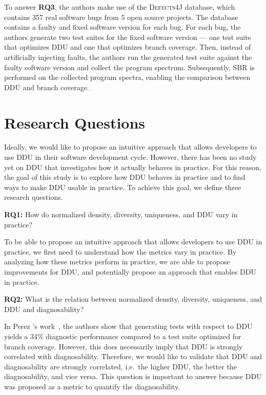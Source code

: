 \documentclass[twoside,a4paper,11pt]{memoir}
\begin{document}
To answer \textbf{RQ3}, the authors make use of the \textsc{Defects4J} database, which contains 357 real software bugs from 5 open source projects.
The database contains a faulty and fixed software version for each bug.
For each bug, the authors generate two test suites for the fixed software version --- one test suite that optimizes DDU and one that optimizes branch coverage.
Then, instead of artificially injecting faults, the authors run the generated test suite against the faulty software version and collect the program spectrum.
Subsequently, SBR is performed on the collected program spectra, enabling the comparison between DDU and branch coverage.

\chapter{Research Questions}%
\label{ch:research_questions}
Ideally, we would like to propose an intuitive approach that allows developers to use DDU in their software development cycle.
However, there has been no study yet on DDU that investigates how it actually behaves in practice.
For this reason, the goal of this study is to explore how DDU behaves in practice and to find ways to make DDU usable in practice.
To achieve this goal, we define three research questions.

\begin{framed}
\noindent
\textbf{RQ1:} How do normalized density, diversity, uniqueness, and DDU vary in practice?
\end{framed}
To be able to propose an intuitive approach that allows developers to use DDU in practice, we first need to understand how the metrics vary in practice.
By analyzing how these metrics perform in practice, we are able to propose improvements for DDU, and potentially propose an approach that enables DDU in practice.

\begin{framed}
\noindent
\textbf{RQ2:} What is the relation between normalized density, diversity, uniqueness, and DDU and diagnosability?
\end{framed}
In Perez \etal's work~\cite{DBLP:conf/icse/PerezAD17}, the authors show that generating tests with respect to DDU yields a 34\% diagnostic performance compared to a test suite optimized for branch coverage.
However, this does necessarily imply that DDU is strongly correlated with diagnosability.
Therefore, we would like to validate that DDU and diagnosability are strongly correlated, i.e.\ the higher DDU, the better the diagnosability, and vice versa.
This question is important to answer because DDU was proposed as a metric to quantify the diagnosability.
\end{document}
